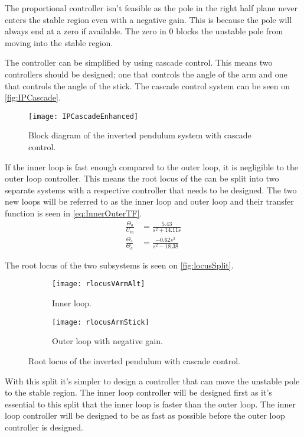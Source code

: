 The proportional controller isn't feasible as the pole in the right half plane never enters the stable region even with a negative gain. This is because the pole will always end at a zero if available. The zero in 0 blocks the unstable pole from moving into the stable region.

The controller can be simplified by using cascade control. This means two controllers should be designed; one that controls the angle of the arm and one that controls the angle of the stick. The cascade control system can be seen on \autoref{fig:IPCascade}.
\begin{figure}[htbp]
\centering
\texttt{[image: IPCascadeEnhanced]}
\caption{Block diagram of the inverted pendulum system with cascade control.}
\label{fig:IPCascade}
\end{figure}

If the inner loop is fast enough compared to the outer loop, it is negligible to the outer loop controller. This means the root locus of the can be split into two separate systems with a respective controller that needs to be designed. The two new loops will be referred to as the inner loop and outer loop and their transfer function is seen in \autoref{eq:InnerOuterTF}.
\begin{subequations}\label{eq:InnerOuterTF}
	\begin{flalign}
		\frac{\Theta_a}{U_m}&= \frac{5.43}{s^2 + 14.11 s} \\
		\frac{\Theta_s}{\Theta_a}&=\frac{-0.62 s^2}{s^2 - 18.38}
	\end{flalign}
\end{subequations}

The root locus of the two subsystems is seen on \autoref{fig:locusSplit}.
\begin{figure}[htbp]
\centering
	\begin{subfigure}{0.45\textwidth}
	\texttt{[image: rlocusVArmAlt]}
	\caption{Inner loop.}
	\label{fig:locusVArm}
	\end{subfigure}
	\begin{subfigure}{0.45\textwidth}
	\texttt{[image: rlocusArmStick]}
	\caption{Outer loop with negative gain.}
	\end{subfigure}
\caption{Root locus of the inverted pendulum with cascade control.}
\label{fig:locusSplit}
\end{figure}

With this split it's simpler to design a controller that can move the unstable pole to the stable region. The inner loop controller will be designed first as it's essential to this split that the inner loop is faster than the outer loop. The inner loop controller will be designed to be as fast as possible before the outer loop controller is designed.
